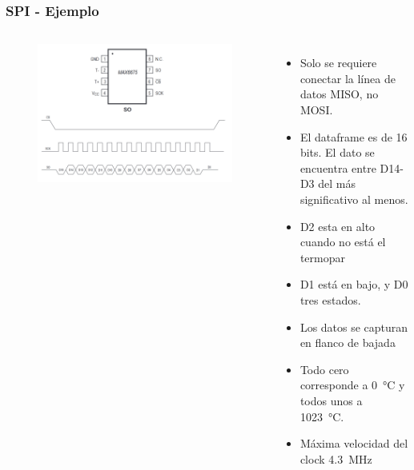 \documentclass[10.5pt,scale=1.0,t,aspectratio=169,hyperref={pdfpagelabels=false}]{beamer}
\begin{document}
\begin{frame}
	\frametitle{SPI - Ejemplo}
	{\small
		\begin{columns}
			\begin{figure}
				\centering
				\includegraphics[scale=0.25]{17_EjemploSPI}
			\end{figure}
			
			\begin{itemize}
				\item Solo se requiere conectar la línea de datos MISO, no MOSI.
				\item El dataframe es de 16 bits. El dato se encuentra entre D14-D3 del más significativo al menos. 
				\item D2 esta en alto cuando no está el termopar
				\item D1 está en bajo, y D0 tres estados. 
				\item Los datos se capturan en flanco de bajada
				\item Todo cero corresponde a \SI{0}{\degreeCelsius} y todos unos a \SI{1023}{\degreeCelsius}. 
				\item Máxima velocidad del clock \SI{4.3}{\mega\hertz}
			\end{itemize}
		\end{columns}
	}
\end{frame}
\end{document}
